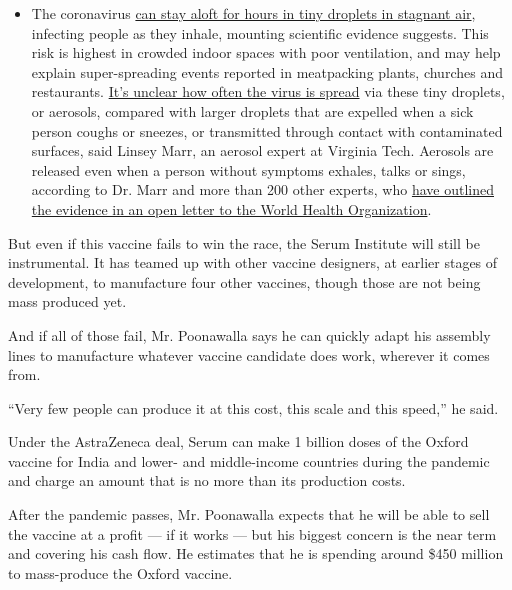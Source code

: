 \begin{itemize}
  \begin{itemize}
  \tightlist
  \item
    The coronavirus
    \href{https://www.nytimes3xbfgragh.onion/2020/07/04/health/239-experts-with-one-big-claim-the-coronavirus-is-airborne.html?action=click\&pgtype=Article\&state=default\&region=MAIN_CONTENT_3\&context=storylines_faq}{can
    stay aloft for hours in tiny droplets in stagnant air}, infecting
    people as they inhale, mounting scientific evidence suggests. This
    risk is highest in crowded indoor spaces with poor ventilation, and
    may help explain super-spreading events reported in meatpacking
    plants, churches and restaurants.
    \href{https://www.nytimes3xbfgragh.onion/2020/07/06/health/coronavirus-airborne-aerosols.html?action=click\&pgtype=Article\&state=default\&region=MAIN_CONTENT_3\&context=storylines_faq}{It's
    unclear how often the virus is spread} via these tiny droplets, or
    aerosols, compared with larger droplets that are expelled when a
    sick person coughs or sneezes, or transmitted through contact with
    contaminated surfaces, said Linsey Marr, an aerosol expert at
    Virginia Tech. Aerosols are released even when a person without
    symptoms exhales, talks or sings, according to Dr. Marr and more
    than 200 other experts, who
    \href{https://academic.oup.com/cid/article/doi/10.1093/cid/ciaa939/5867798}{have
    outlined the evidence in an open letter to the World Health
    Organization}.
  \end{itemize}
\end{itemize}

But even if this vaccine fails to win the race, the Serum Institute will
still be instrumental. It has teamed up with other vaccine designers, at
earlier stages of development, to manufacture four other vaccines,
though those are not being mass produced yet.

And if all of those fail, Mr. Poonawalla says he can quickly adapt his
assembly lines to manufacture whatever vaccine candidate does work,
wherever it comes from.

``Very few people can produce it at this cost, this scale and this
speed,'' he said.

Under the AstraZeneca deal, Serum can make 1 billion doses of the Oxford
vaccine for India and lower- and middle-income countries during the
pandemic and charge an amount that is no more than its production costs.

After the pandemic passes, Mr. Poonawalla expects that he will be able
to sell the vaccine at a profit --- if it works --- but his biggest
concern is the near term and covering his cash flow. He estimates that
he is spending around \$450 million to mass-produce the Oxford vaccine.

